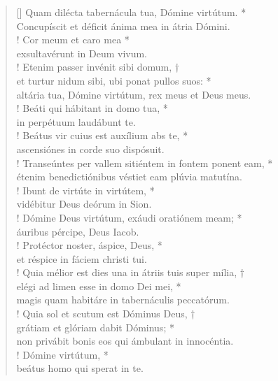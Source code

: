 \begin{verse}[\versewidth]
Quam dilécta tabernácula tua, Dómine virtútum. *\\
Concupíscit et déficit ánima mea in átria Dómini.\\!
\vin Cor meum et caro mea *\\
\vin exsultavérunt in Deum vivum.\\!
Etenim passer invénit sibi domum, †\\
et turtur nidum sibi, ubi ponat pullos suos: *\\
altária tua, Dómine virtútum, rex meus et Deus meus.\\!
\vin Beáti qui hábitant in domo tua, *\\
\vin in perpétuum laudábunt te.\\!
Beátus vir cuius est auxílium abs te, *\\
ascensiónes in corde suo dispósuit.\\!
\vin Transeúntes per vallem sitiéntem in fontem ponent eam, *\\
\vin étenim benedictiónibus véstiet eam plúvia matutína.\\!
Ibunt de virtúte in virtútem, *\\
vidébitur Deus deórum in Sion.\\!
\vin Dómine Deus virtútum, exáudi oratiónem meam; *\\
\vin áuribus pércipe, Deus Iacob.\\!
Protéctor noster, áspice, Deus, *\\
et réspice in fáciem christi tui.\\!
\vin Quia mélior est dies una in átriis tuis super mília, †\\
\vin elégi ad limen esse in domo Dei mei, *\\
\vin magis quam habitáre in tabernáculis peccatórum.\\!
Quia sol et scutum est Dóminus Deus, †\\
grátiam et glóriam dabit Dóminus; *\\
non privábit bonis eos qui ámbulant in innocéntia.\\!
\vin Dómine virtútum, *\\
\vin beátus homo qui sperat in te.\\
\end{verse}
\vspace{1cm}



